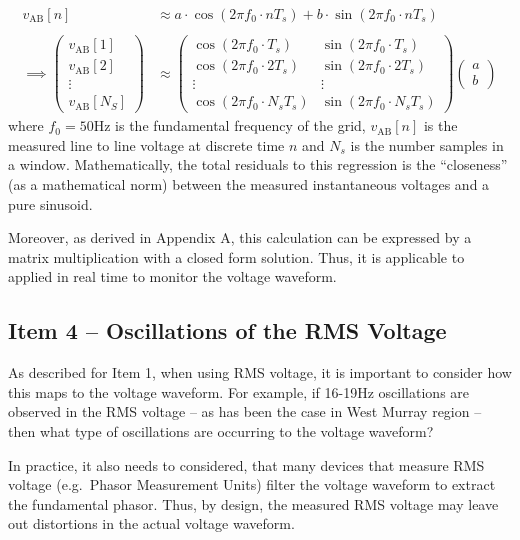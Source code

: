 \documentclass[11pt,a4paper,]{article}
\begin{document}
\[
\begin{aligned}
v_{\text{AB}}[n] &\approx a\cdot\cos\left(2\pi f_0\cdot nT_s\right) + b\cdot\sin\left(2\pi f_0\cdot nT_s\right) \\ \\
\implies
\begin{pmatrix}
v_{\text{AB}}[1] \\
v_{\text{AB}}[2] \\
\vdots \\
v_{\text{AB}}[N_S]
\end{pmatrix}
&\approx
\begin{pmatrix}
\cos\left(2\pi f_0\cdot T_s\right) & \sin\left(2\pi f_0\cdot T_s\right) \\
\cos\left(2\pi f_0\cdot 2T_s\right) & \sin\left(2\pi f_0\cdot 2T_s\right) \\
\vdots & \vdots \\
\cos\left(2\pi f_0\cdot N_sT_s\right) & \sin\left(2\pi f_0\cdot N_sT_s\right)
\end{pmatrix}
\begin{pmatrix}
a \\ b
\end{pmatrix}
\end{aligned}
\]
where \(f_0=50\)Hz is the fundamental frequency of the grid, \(v_{\text{AB}}[n]\) is the measured line to line voltage at discrete time \(n\) and \(N_s\) is the number samples in a window. Mathematically, the total residuals to this regression is the ``closeness'' (as a mathematical norm) between the measured instantaneous voltages and a pure sinusoid.

Moreover, as derived in Appendix A, this calculation can be expressed by a matrix multiplication with a closed form solution. Thus, it is applicable to applied in real time to monitor the voltage waveform.

\subsection{Item 4 -- Oscillations of the RMS Voltage}

As described for Item 1, when using RMS voltage, it is important to consider how this maps to the voltage waveform. For example, if 16-19Hz oscillations are observed in the RMS voltage -- as has been the case in West Murray region -- then what type of oscillations are occurring to the voltage waveform?

In practice, it also needs to considered, that many devices that measure RMS voltage (e.g.~Phasor Measurement Units) filter the voltage waveform to extract the fundamental phasor. Thus, by design, the measured RMS voltage may leave out distortions in the actual voltage waveform.
\end{document}
